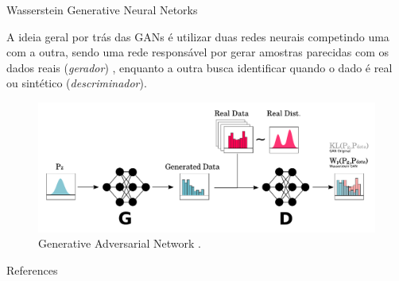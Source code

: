 \documentclass[10pt]{beamer}
\begin{document}
\begin{frame}[fragile]{Wasserstein Generative Neural Netorks}

	A ideia geral por trás das GANs é utilizar duas redes neurais
	competindo uma com a outra, sendo uma rede responsável por
	gerar amostras parecidas com os dados reais (\textit{gerador}) , enquanto a outra
	busca identificar quando o dado é real ou sintético
	(\textit{descriminador}).

	\begin{figure}[H]
		\begin{center}
			\includegraphics[width=1.0\textwidth]{Figures/wgan.pdf}
		\end{center}
		\caption{Generative Adversarial Network \citep{sales2021optimal}.}
	\end{figure}

\end{frame}



\begin{frame}[allowframebreaks]{References}
	\nocite{*}

	\renewcommand{\section}[2]{}%
	\tiny{}
	
\end{frame}
\end{document}
